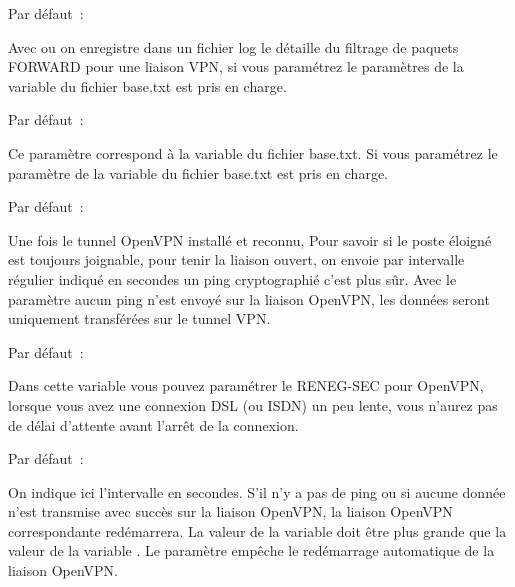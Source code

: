 \begin{description}
  Par défaut~: 

  Avec  ou  on enregistre dans un fichier log le détaille
  du filtrage de paquets FORWARD pour une liaison VPN, si vous paramétrez
   le paramètres de la variable  du fichier
  base.txt est pris en charge.


  Par défaut~: 

  Ce paramètre correspond à la variable 
  du fichier base.txt. Si vous paramétrez  le paramètre de la
  variable  du fichier base.txt est pris en charge.


  Par défaut~: 

  Une fois le tunnel OpenVPN installé et reconnu, Pour savoir si le poste éloigné
  est toujours joignable, pour tenir la liaison ouvert, on envoie par intervalle
  régulier indiqué en secondes un ping cryptographié c'est plus sûr. Avec le
  paramètre  aucun ping n'est envoyé sur la liaison OpenVPN, les données
  seront uniquement transférées sur le tunnel VPN.


  Par défaut~: 

  Dans cette variable vous pouvez paramétrer le RENEG-SEC pour OpenVPN, lorsque
  vous avez une connexion DSL (ou ISDN) un peu lente, vous n'aurez pas de délai
  d'attente avant l'arrêt de la connexion.


  Par défaut~: 

  On indique ici l'intervalle en secondes. S'il n'y a pas de ping ou si aucune
  donnée n'est transmise avec succès sur la liaison OpenVPN, la liaison OpenVPN
  correspondante redémarrera. La valeur de la variable 
  doit être plus grande que la valeur de la variable .
  Le paramètre  empêche le redémarrage automatique de la liaison OpenVPN.


\end{description}
